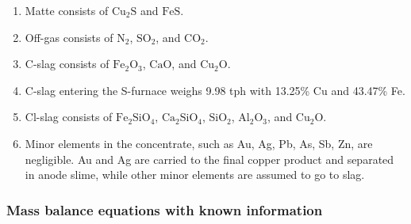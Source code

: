 \documentclass[10pt]{article}
\begin{document}
    
\begin{enumerate}
    \item Matte consists of $\text{Cu}_2\text{S}$ and $\text{FeS}$.
    
    \item Off-gas consists of $\text{N}_2$, $\text{SO}_2$, and $\text{CO}_2$.
    
    \item C-slag consists of $\text{Fe}_2\text{O}_3$, $\text{CaO}$, and $\text{Cu}_2\text{O}$.
    
    \item C-slag entering the S-furnace weighs 9.98 tph with 13.25\% Cu and 43.47\% Fe.
    
    \item Cl-slag consists of $\text{Fe}_2\text{SiO}_4$, $\text{Ca}_2\text{SiO}_4$, $\text{SiO}_2$, $\text{Al}_2\text{O}_3$, and $\text{Cu}_2\text{O}$.
    
    \item Minor elements in the concentrate, such as Au, Ag, Pb, As, Sb, Zn, are negligible. Au and Ag are carried to the final copper product and separated in anode slime, while other minor elements are assumed to go to slag.
\end{enumerate}


\subsubsection{Mass balance equations with known information}
\end{document}
